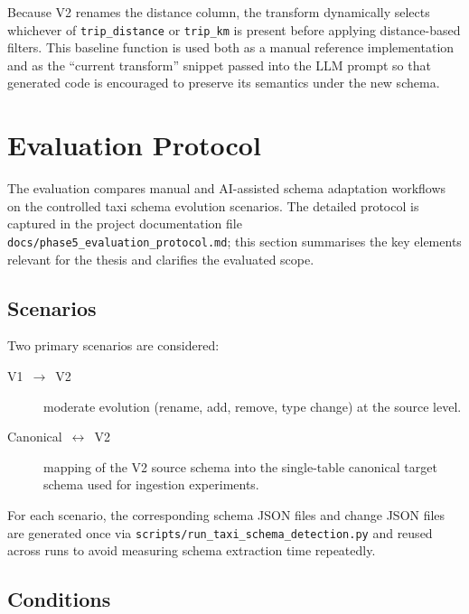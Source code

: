 Because V2 renames the distance column, the transform dynamically
selects whichever of \texttt{trip\_distance} or
\texttt{trip\_km} is present before applying distance-based filters.
This baseline function is used both as a manual reference implementation and
as the ``current transform'' snippet passed into the LLM prompt so that
generated code is encouraged to preserve its semantics under the new schema.


\section{Evaluation Protocol}
\label{sec:method-eval}

The evaluation compares manual and AI-assisted schema adaptation workflows on
the controlled taxi schema evolution scenarios. The detailed protocol is
captured in the project documentation file
\texttt{docs/phase5\_evaluation\_protocol.md}; this section summarises the key
elements relevant for the thesis and clarifies the evaluated scope.

\subsection{Scenarios}

Two primary scenarios are considered:
%
\begin{description}
  \item[V1~$\rightarrow$~V2] moderate evolution (rename, add, remove, type
  change) at the source level.
  \item[Canonical~$\leftrightarrow$~V2] mapping of the V2 source schema into the
  single-table canonical target schema used for ingestion experiments.
\end{description}

For each scenario, the corresponding schema JSON files and change JSON files
are generated once via \texttt{scripts/run\_taxi\_schema\_detection.py} and
reused across runs to avoid measuring schema extraction time repeatedly.


\subsection{Conditions}

